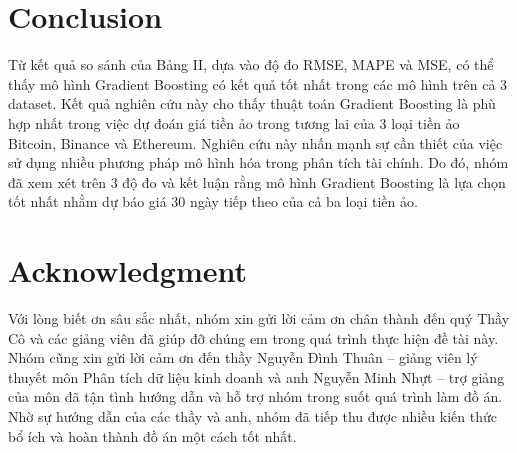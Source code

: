 \documentclass[conference]{IEEEtran}
\begin{document}
\section{Conclusion}
Từ kết quả so sánh của Bảng II, dựa vào độ đo RMSE, MAPE và MSE, có thể thấy mô hình Gradient Boosting có kết quả tốt nhất trong các mô hình trên cả 3 dataset. Kết quả nghiên cứu này cho thấy thuật toán Gradient Boosting là phù hợp nhất trong việc dự đoán giá tiền ảo trong tương lai của 3 loại tiền ảo Bitcoin, Binance và Ethereum. Nghiên cứu này nhấn mạnh sự cần thiết của việc sử dụng nhiều phương pháp mô hình hóa trong phân tích tài chính. Do đó, nhóm đã xem xét trên 3 độ đo và kết luận rằng mô hình Gradient Boosting là lựa chọn tốt nhất nhằm dự báo giá 30 ngày tiếp theo của cả ba loại tiền ảo.
\section*{Acknowledgment}
Với lòng biết ơn sâu sắc nhất, nhóm xin gửi lời cảm ơn chân thành đến quý Thầy Cô và các giảng viên đã giúp đỡ chúng em trong quá trình thực hiện đề tài này. Nhóm cũng xin gửi lời cảm ơn đến thầy Nguyễn Đình Thuân – giảng viên lý thuyết môn Phân tích dữ liệu kinh doanh và anh Nguyễn Minh Nhựt – trợ giảng của môn đã tận tình hướng dẫn và hỗ trợ nhóm trong suốt quá trình làm đồ án. Nhờ sự hướng dẫn của các thầy và anh, nhóm đã tiếp thu được nhiều kiến thức bổ ích và hoàn thành đồ án một cách tốt nhất.


\end{document}
